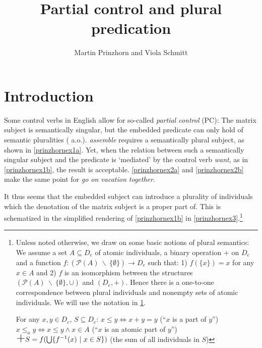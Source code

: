\documentclass[output=paper,colorlinks,citecolor=brown,
]{langscibook}
\author{Martin Prinzhorn\affiliation{University of Vienna} and Viola Schmitt\affiliation{Humboldt University Berlin}\orcid{}}
\title{Partial control and plural predication}
\newcommand{\bigplus}{\ensuremath{\mbox{\LARGE+}}}
\begin{document}
\maketitle

\section{Introduction}\label{prinzhornsec:1}



Some control verbs in English allow for so-called  {\it partial control} (PC): The matrix subject is semantically singular, but the embedded predicate can only hold of semantic pluralities (\cite{Wilkinson:1971, Landau:2000, Wurmbrand:2001, Wurmbrand:2002, Pearson:2016} a.o.). {\it assemble} requires a semantically plural subject, as shown in \ref{prinzhornex1a}. Yet, when the relation between such a semantically singular subject and the predicate is `mediated' by the control verb {\it want}, as in \ref{prinzhornex1b}, the result is acceptable. \ref{prinzhornex2a} and \ref{prinzhornex2b} make the same point for {\it go on vacation together}.

\ea  
{} \label{prinzhornex1a}
 \hfill \cite[(1a)]{Pearson:2016} \label{prinzhornex1b}
 \label{prinzhornex2a}
 \hfill \cite[(1a)]{Pearson:2016} \label{prinzhornex2b}
\z\z
	
It thus seems that the embedded subject can introduce a plurality of individuals which the denotation of the matrix subject is a proper part of. This is schematized in the simplified rendering of \ref{prinzhornex1b} in \ref{prinzhornex3}.\footnote{Unless noted otherwise, we draw on some basic notions of plural semantics: We assume a set $A \subseteq D_e$ of atomic individuals, a binary operation $+$ on $D_e$ and a function $f: (\mathcal{P}(A)\ \backslash\ \{\emptyset\}) \to D_e$ such that: 1) $f(\{x\}) = x$ for any $x \in A$ and 2) $f$ is an isomorphism between the structures $(\mathcal{P}(A)\ \backslash\ \{\emptyset\}, \cup)$ and $(D_e, +)$. Hence there is a one-to-one correspondence between plural individuals and nonempty sets of atomic individuals. We will use the notation in \ref{prinzhornDD}.

\ea \label{prinzhornDD} For any $x, y \in D_e$, $S \subseteq D_e$:
\ea $x \leq y \Leftrightarrow x + y = y$ (``$x$ is a part of $y$'')
 \ex $x \leq_{a} y \Leftrightarrow x \leq y \land x \in A$ (``$x$ is an atomic part of $y$'')
\ex  $\bigplus S = f(\bigcup\{f^{-1}(x)\ |\ x \in S\})$ (the sum of all individuals in $S$)
\z\z




}
\end{document}
